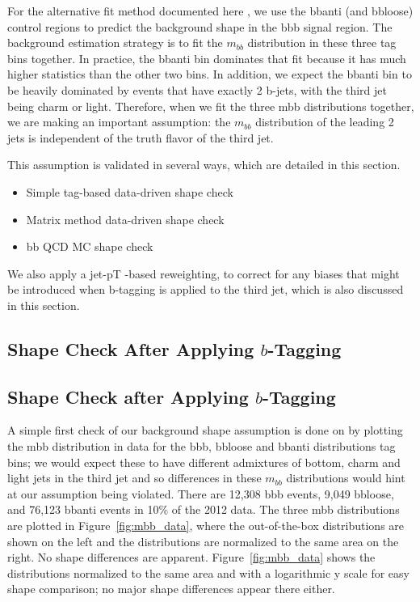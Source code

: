 For the alternative fit method documented here , we use the bbanti (and bbloose) control regions to predict the background shape in the bbb signal region.
The background estimation strategy is to fit the $m_{bb}$ distribution in these three tag bins together. In
 practice, the bbanti bin dominates that fit because it has much higher statistics than the other two bins. In
 addition, we expect the bbanti bin to be heavily dominated by events that have exactly 2 b-jets, with the
 third jet being charm or light. Therefore, when we fit the three mbb distributions together, we are making
 an important assumption: the $m_{bb}$ distribution of the leading 2 jets is independent of the truth flavor of the third jet.

This assumption is validated in several ways, which are detailed in this section.
\begin{itemize}
    \item Simple tag-based data-driven shape check
    \item Matrix method data-driven shape check
    \item bb QCD MC shape check
\end{itemize}
 We also apply a jet-pT -based reweighting, to correct for any biases that might be introduced when
 b-tagging is applied to the third jet, which is also discussed in this section.


\subsection{Shape Check After Applying $b$-Tagging}
\subsection{Shape Check after Applying $b$-Tagging}
A simple first check of our background shape assumption is done on by plotting the mbb distribution
 in data for the bbb, bbloose and bbanti distributions tag bins; we would expect these to have different
 admixtures of bottom, charm and light jets in the third jet and so differences in these $m_{bb}$ distributions
 would hint at our assumption being violated. There are 12,308 bbb events, 9,049 bbloose, and 76,123
 bbanti events in 10\% of the 2012 data. The three mbb distributions are plotted in Figure~\ref{fig:mbb_data}, where the
 out-of-the-box distributions are shown on the left and the distributions are normalized to the same area
 on the right. No shape differences are apparent. Figure~\ref{fig:mbb_data} shows the distributions normalized to the
 same area and with a logarithmic y scale for easy shape comparison; no major shape differences appear
 there either.

